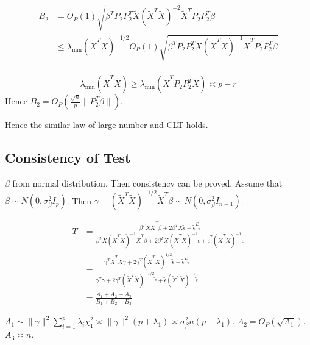 \documentclass[review]{elsarticle}
\theoremstyle{plain}
\theoremstyle{definition}
\theoremstyle{remark}
\begin{document}
\begin{equation}
    \begin{aligned}
    B_2&=O_P(1)\sqrt{\beta^T P_2 P_2^T \tilde{X}{(\tilde{X}^T\tilde{X})}^{-2}\tilde{X}^T P_2 P_2^T \beta}\\
    &\leq \lambda_{\min}{(\tilde{X}^T\tilde{X})}^{-1/2}O_P(1)\sqrt{\beta^T P_2 P_2^T \tilde{X}{(\tilde{X}^T\tilde{X})}^{-1}\tilde{X}^T P_2 P_2^T \beta}\\
    \end{aligned}
\end{equation}

\begin{equation}
    \lambda_{\min}{(\tilde{X}^T\tilde{X})}\geq \lambda_{\min}{(\tilde{X}^T P_2 P_2^T \tilde{X})}\asymp p-r
\end{equation}
Hence $B_2=O_P(\frac{\sqrt{n}}{p}\|P_2^T \beta\|)$.

Hence the similar law of large number and CLT holds.

\subsection{Consistency of Test}
$\beta$ from normal distribution. Then consistency can be proved.
Assume that $\beta\sim N(0,\sigma^2_{\beta}I_{p})$. Then
$\gamma={(\tilde{X}^T \tilde{X})}^{-1/2}\tilde{X}^T\beta\sim N(0,\sigma^2_{\beta}I_{n-1})$.


\begin{equation}
    \begin{aligned}
        T&=\frac{\beta^T \tilde{X}\tilde{X}^T \beta+
        2\beta^T \tilde{X}\tilde{\epsilon}+
        \tilde{\epsilon}^T\tilde{\epsilon}
    }{\beta^T \tilde{X}{(\tilde{X}^T\tilde{X})}^{-1}\tilde{X}^T \beta+
        2\beta^T \tilde{X}{(\tilde{X}^T\tilde{X})}^{-1}\tilde{\epsilon}+
        \tilde{\epsilon}^T{(\tilde{X}^T\tilde{X})}^{-1}\tilde{\epsilon}
    }\\
        &=\frac{\gamma^T\tilde{X}^T\tilde{X}\gamma+2\gamma^T{(\tilde{X}^T\tilde{X})}^{1/2}\tilde{\epsilon}+\tilde{\epsilon}^T\tilde{\epsilon}}{\gamma^T\gamma+2\gamma^T{(\tilde{X}^T\tilde{X})}^{-1/2}\tilde{\epsilon}+\tilde{\epsilon}{(\tilde{X}^T\tilde{X})}^{-1}\tilde{\epsilon}}\\
        &=\frac{A_1+A_2+A_3}{B_1+B_2+B_3}
    \end{aligned}
\end{equation}

$A_1\sim \|\gamma\|^2\sum_{i=1}^{p}\lambda_i \chi^2_1\asymp \|\gamma\|^2 (p+\lambda_1)\asymp \sigma^2_\beta n(p+\lambda_1)$. $A_2=O_P(\sqrt{A_1})$. $A_3\asymp n$.
\end{document}
